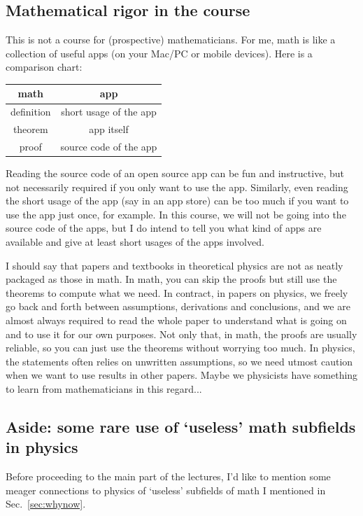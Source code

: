 \documentclass[12pt]{article}
\numberwithin{equation}{section}
\numberwithin{figure}{section}
\theoremstyle{remark}
\begin{document}
\subsection{Mathematical rigor in the course}
This is not a course for (prospective) mathematicians. 
For me, math is like a collection of useful apps (on your Mac/PC or mobile devices).
Here is a comparison chart:
\begin{center}
\begin{tabular}{|c|c|}
  \hline
  math & app \\
  \hline
  definition & short usage of the app \\
  theorem & app itself \\
  proof & source code of the app \\
  \hline
\end{tabular}
\end{center}
Reading the source code of an open source app can be fun and instructive,
but not necessarily required if you only want to use the app. 
Similarly, even reading the short usage of the app (say in an app store) can be too much 
if you want to use the app just once, for example.
In this course, we will not be going into the source code of the apps,
but I do intend to tell you what kind of apps are available
and give at least short usages of the apps involved.

I should say that papers and textbooks in theoretical physics are not as neatly packaged as those in math.
In math, you can skip the proofs but still use the theorems to compute what we need.
In contract, in papers on physics, we freely go back and forth between assumptions, derivations and conclusions,
and we are almost always required to read the whole paper to understand what is going on and to use it for our own purposes.
Not only that, in math, the proofs are usually reliable, so you can just use the theorems without worrying too much.
In physics, the statements often relies on unwritten assumptions, so we need utmost caution when we want 
to use results in other papers. 
Maybe we physicists have something to learn from mathematicians in this regard...

\subsection{Aside: some rare use of `useless' math subfields in physics}
Before proceeding to the main part of the lectures,
I'd like to mention some meager connections to physics of `useless' subfields of math I mentioned in Sec.~\ref{sec:whynow}.
\end{document}
